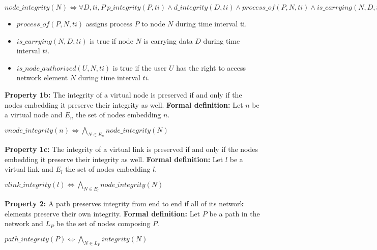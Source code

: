 \begin{myformula}
$node\_integrity(N) \Leftrightarrow \forall D,ti,P~p\_integrity(P,ti) \wedge d\_integrity(D,ti) \wedge process\_of(P,N,ti) \wedge is\_carrying(N,D,ti) \Rightarrow is\_node\_authorized(U,N,ti)$
\end{myformula}

\begin{itemize}
\item $process\_of(P,N,ti)$ assigns process $P$ to node $N$ during time interval ti.
\item $is\_carrying(N,D,ti)$ is true if node $N$ is carrying data $D$ during time interval $ti$.
\item $is\_node\_authorized(U,N,ti)$ is true if the user $U$ has the right to access network element $N$ during time interval $ti$.
\end{itemize}

\textbf{Property 1b:} The integrity of a virtual node is preserved if and only if the nodes embedding it preserve their integrity as well.
\newline
\textbf{Formal definition:} Let $n$ be a virtual node and $E_n$ the set of nodes embedding $n$.

\begin{myformula}
$vnode\_integrity(n) \Leftrightarrow \bigwedge\limits_{N \in E_n} node\_integrity(N)$
\end{myformula}

\textbf{Property 1c:} The integrity of a virtual link is preserved if and only if the nodes embedding it preserve their integrity as well.
\newline
\textbf{Formal definition:} Let $l$ be a virtual link and $E_l$ the set of nodes embedding $l$.

\begin{myformula}
$vlink\_integrity(l) \Leftrightarrow \bigwedge\limits_{N \in E_l} node\_integrity(N)$
\end{myformula}


\textbf{Property 2:} A path preserves integrity from end to end if all of its network elements preserve their own integrity.
\newline \textbf{Formal definition:} Let $P$ be a path in the network and $L_P$ be the set of nodes composing $P$.
\newline

\begin{myformula}
$path\_integrity(P) \Leftrightarrow \bigwedge\limits_{N \in L_P}integrity(N) $
\end{myformula}

